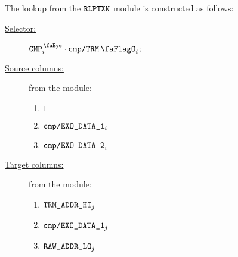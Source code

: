 The lookup from the $\texttt{RLPTXN}$ module is constructed as follows:
\begin{description}
	\item[\underline{Selector:}] $\isCmp_{i} \cdot \rlpTxnComputationColumnTrmFlag_{i}$;
	\item[\underline{Source columns:}] from the \rlpTxnMod{} module:
	\begin{multicols}{3}
	\begin{enumerate}
		\item $1$
		\item $\texttt{cmp}\texttt{/}\texttt{{\texttt{EXO\_DATA\_1}}}_{i}$
		\item $\texttt{cmp}\texttt{/}\texttt{{\texttt{EXO\_DATA\_2}}}_{i}$
		
	\end{enumerate}
	\end{multicols}
\item[\underline{Target columns:}] from the \trmMod{} module: 
	\begin{multicols}{3}
	\begin{enumerate}
		\item $\texttt{TRM}\texttt{\_}\texttt{ADDR}\texttt{\_HI}_{j}$
		\item $\texttt{cmp}\texttt{/}\texttt{{\texttt{EXO\_DATA\_1}}}_{j}$
		\item $\texttt{RAW\_ADDR\_LO}_{j}$
	\end{enumerate} 
	\end{multicols}
\end{description}
